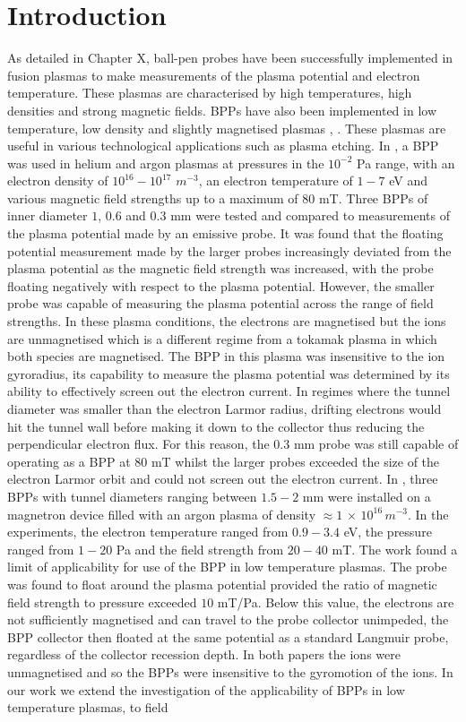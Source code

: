 \section{Introduction}

As detailed in Chapter X, ball-pen probes have been successfully implemented in fusion plasmas to make measurements of the plasma potential and electron temperature. These plasmas are characterised by high temperatures, high densities and strong magnetic fields. BPPs have also been implemented in low temperature, low density and slightly magnetised plasmas \cite{alow_temp}, \cite{low_t} \cite{mirabelle}. These plasmas are useful in various technological applications such as plasma etching. In \cite{mirabelle}, a BPP was used  in helium and argon plasmas at pressures in the $10^{-2}$ Pa range, with an electron density of $10^{16} - 10^{17}$ $m^{-3}$, an electron temperature of $1-7$ eV and various magnetic field strengths up to a maximum of 80 mT. Three BPPs of inner diameter $1$, $0.6$ and $0.3$ mm were tested and compared to measurements of the plasma potential made by an emissive probe. It was found that the floating potential measurement made by the larger probes increasingly deviated from the plasma potential as the magnetic field strength was increased, with the probe floating negatively with respect to the plasma potential. However, the smaller probe was capable of measuring the plasma potential across the range of field strengths. In these plasma conditions, the electrons are magnetised but the ions are unmagnetised which is a different regime from a tokamak plasma in which both species are magnetised. The BPP in this plasma was insensitive to the ion gyroradius, its capability to measure the plasma potential was determined by its ability to effectively screen out the electron current. In regimes where the tunnel diameter was smaller than the electron Larmor radius, drifting electrons would hit the tunnel wall before making it down to the collector thus reducing the perpendicular electron flux. For this reason, the $0.3$ mm probe was still capable of operating as a BPP at $80$ mT whilst the larger probes exceeded the size of the electron Larmor orbit and could not screen out the electron current. In \cite{low_t}, three BPPs with tunnel diameters ranging between $1.5-2$ mm were installed on a magnetron device filled with an argon plasma of density $\approx 1 \, \times \, 10^{16} \, m^{-3}$. In the experiments, the electron temperature ranged from $0.9-3.4$ eV, the pressure ranged from $1-20$ Pa and the field strength from $20-40$ mT. The work found a limit of applicability for use of the BPP in low temperature plasmas. The probe was found to float around the plasma potential provided the ratio of magnetic field strength to pressure exceeded $10$ mT/Pa. Below this value, the electrons are not sufficiently magnetised and can travel to the probe collector unimpeded, the BPP collector then floated at the same potential as a standard Langmuir probe, regardless of the collector recession depth. In both papers the ions were unmagnetised and so the BPPs were insensitive to the gyromotion of the ions. In our work we extend the investigation of the applicability of BPPs in low temperature plasmas, to field 